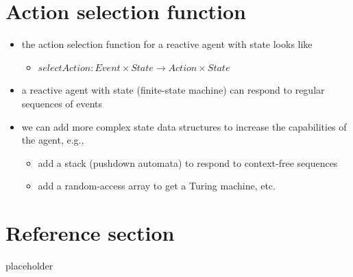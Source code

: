 \documentclass{article}
\begin{document}
\section{Action selection function}
\begin{itemize}
  \item the action selection function for a reactive agent with state looks like 
  \begin{itemize}
    \item $selectAction : Event × State \rightarrow Action × State$
  \end{itemize}
  \item a reactive agent with state (finite-state machine) can respond to regular sequences of events 
  \item we can add more complex state data structures to increase the capabilities of the agent, e.g.,
  \begin{itemize}
    \item add a stack (pushdown automata) to respond to context-free sequences 
    \item add a random-access array to get a Turing machine, etc.
  \end{itemize}
\end{itemize}

\pagebreak
\section*{Reference section} \label{sec:reference}
\begin{description}
	\item[placeholder] \hfill \\
\end{description}
\end{document}
